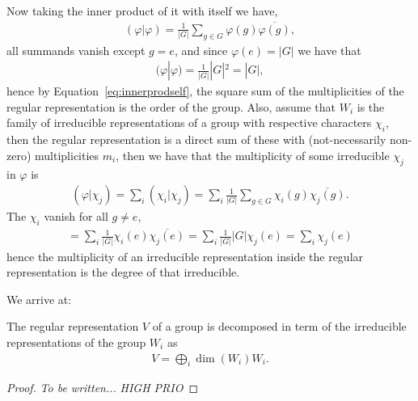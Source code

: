Now taking the inner product of it with itself we have,
\begin{align*}
	(\varphi|\varphi) = \frac{1}{|G|} \sum_{g \in G} \varphi(g)\overline{\varphi(g)},
\end{align*}
all summands vanish except $g = e$, and since $\varphi(e) = |G|$ we have that
\begin{align*}
	(\varphi|\varphi) = \frac{1}{|G|} |G|^2 = |G|,
\end{align*}
hence by Equation~\ref{eq:innerprodself}, the square sum of the multiplicities of the regular representation is the order of the group. Also, assume that ${W_i}$ is the family of irreducible representations of a group with respective characters $\chi_i$, then the regular representation is a direct sum of these with (not-necessarily non-zero) multiplicities $m_i$, then we have that the multiplicity of some irreducible $\chi_j$ in $\varphi$ is
\begin{align*}
	(\varphi|\chi_j) = \sum_i (\chi_i|\chi_j) = \sum_i \frac{1}{|G|} \sum_{g \in G} \chi_i(g) \overline{\chi_j(g)}.
\end{align*}
The $\chi_i$ vanish for all $g \neq e$, 
\begin{align*}
	= \sum_i \frac{1}{|G|} \chi_i(e) \overline{\chi_j(e)} = \sum_i \frac{1}{|G|}|G|\chi_j(e) = \sum_i \chi_j(e)
\end{align*}
hence the multiplicity of an irreducible representation inside the regular representation is the degree of that irreducible.

We arrive at:
\begin{theorem}
	The regular representation $V$ of a group is decomposed in term of the irreducible representations of the group $W_i$ as
	\begin{align*}
		V = \bigoplus_i \dim (W_i) W_i.
	\end{align*}
\end{theorem}

\begin{proof}
	\textit{To be written...} \textit{HIGH PRIO}
\end{proof}

